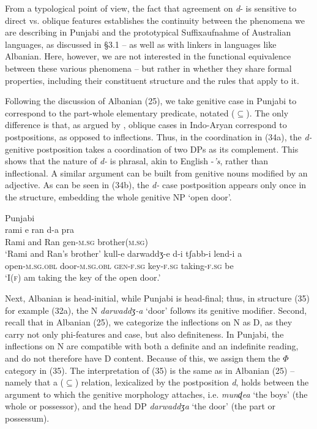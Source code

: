 \documentclass[output=paper]{langsci/langscibook}
\begin{document}
From a typological point of view, the fact that agreement on \textit{d}{}- is sensitive to direct vs. oblique features establishes the continuity between the phenomena we are describing in Punjabi and the prototypical Suffixaufnahme of Australian languages, as discussed in §3.1 – as well as with linkers in languages like Albanian. Here, however, we are not interested in the functional equivalence between these various phenomena – but rather in whether they share formal properties, including their constituent structure and the rules that apply to it.    

Following the discussion of Albanian (25), we take genitive case in Punjabi to correspond to the part-whole elementary predicate, notated ($\subseteq$). The only difference is that, as argued by \citet{Payne1995}, oblique cases in Indo-Aryan correspond to postpositions, as opposed to inflections. Thus, in the coordination in (34a), the \textit{d-} genitive postposition takes a coordination of two DPs as its complement. This shows that the nature of \textit{d-} is phrasal, akin to English -\textit{’s}, rather than inflectional. A similar argument can be built from genitive nouns modified by an adjective. As can be seen in (34b), the \textit{d-} case postposition appears only once in the structure, embedding the whole genitive NP ‘open door’.

\ea%
    Punjabi\label{ex:manzini:34}\\
    \ea
    \gll    rami   e   ran   d-a   pra\\
              Rami   and  Ran  gen-\textsc{m.sg}  brother\textsc{(m.sg)}  \\
    \glt     ‘Rami and Ran’s brother’
    \ex  
    \gll    kull-e   darwaddʒ-e  d-i   tʃabb-i   lend-i   a  \\
             open-\textsc{m.sg.obl}   door-\textsc{m.sg.obl}  \textsc{gen-f.sg}   key-\textsc{f.sg}  taking-\textsc{f.sg}  be \\
    \glt     ‘I(\textsc{f}) am taking the key of the open door.’ 
    \z
\z

Next, Albanian is head-initial, while Punjabi is head-final; thus, in structure (35) for example (32a), the N \textit{darwaddʒ-a} ‘door’ follows its genitive modifier. Second, recall that in Albanian (25), we categorize the inflections on N as D, as they carry not only phi-features and case, but also definiteness. In Punjabi, the inflections on N are compatible with both a definite and an indefinite reading, and do not therefore have D content. Because of this, we assign them the $\Phi $ category in (35). The interpretation of (35) is the same as in Albanian (25) – namely that a ($\subseteq$) relation, lexicalized by the postposition \textit{d}, holds between the argument to which the genitive morphology attaches, i.e. \textit{munɖea} ‘the boys’ (the whole or possessor), and the head DP \textit{darwaddʒ}\textit{a} ‘the door’ (the part or possessum).
\end{document}
